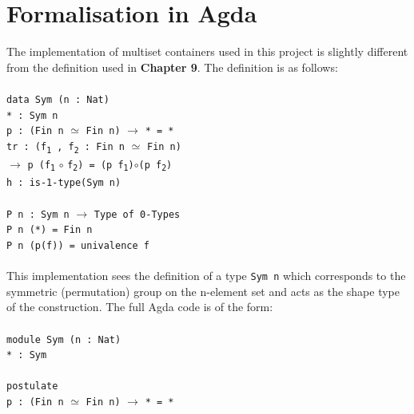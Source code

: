 \documentclass[12pt]{report}
\begin{document}
\chapter{Formalisation in Agda}
The implementation of multiset containers used in this project is slightly different from the definition used in \textbf{Chapter 9}. The definition is as follows:\\
\\
\-\hspace{3cm}\texttt{data Sym (n : Nat)}\\
\-\hspace{4cm}\texttt{* : Sym n}\\
\-\hspace{4cm}\texttt{p : (Fin n} $\simeq$ \texttt{Fin n)} $\to$ \texttt{* = *}\\
\-\hspace{4cm}\texttt{tr : (f\textsubscript{1} , f\textsubscript{2} : Fin n} $\simeq$ \texttt{Fin n)}\\
\-\hspace{5.3cm}$\to$ \texttt{p (f\textsubscript{1}} $\circ$ \texttt{f\textsubscript{2}) = (p f\textsubscript{1})}$\circ$\texttt{(p f\textsubscript{2})}\\
\-\hspace{4cm}\texttt{h : is-1-type(Sym n)}\\
\\
\-\hspace{4cm}\texttt{P n : Sym n} $\to$ \texttt{Type of 0-Types}\\
\-\hspace{4cm}\texttt{P n (*) = Fin n}\\
\-\hspace{4cm}\texttt{P n (p(f)) = univalence f}\\
\\
This implementation sees the definition of a type \texttt{Sym n} which corresponds to the symmetric (permutation) group on the n-element set and acts as the shape type of the construction. The full Agda code is of the form:\\
\\
\-\hspace{3cm}\texttt{module Sym (n : Nat)}\\
\-\hspace{4cm}\texttt{* : Sym}\\
\\
\-\hspace{4cm}\texttt{postulate}\\
\-\hspace{5cm}\texttt{p : (Fin n} $\simeq$ \texttt{Fin n)} $\to$ \texttt{* = *}\\
\end{document}
